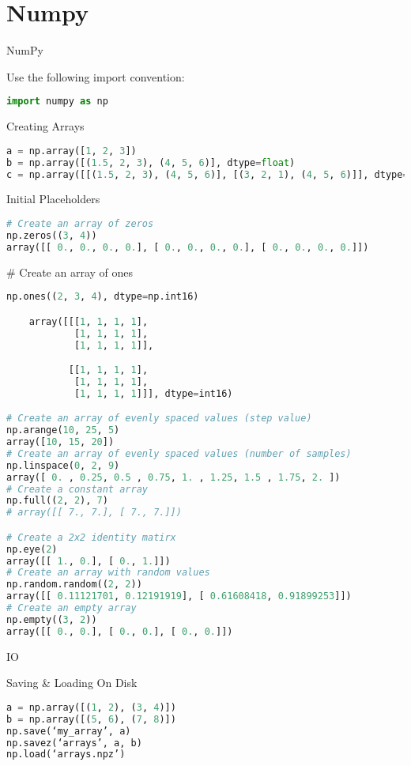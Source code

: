 \section{Numpy}

NumPy

Use the following import convention:

\begin{lstlisting}[language=Python]
import numpy as np
\end{lstlisting}

Creating Arrays

\begin{lstlisting}[language=Python]
a = np.array([1, 2, 3])
b = np.array([(1.5, 2, 3), (4, 5, 6)], dtype=float)
c = np.array([[(1.5, 2, 3), (4, 5, 6)], [(3, 2, 1), (4, 5, 6)]], dtype=float)
\end{lstlisting}

Initial Placeholders

\begin{lstlisting}[language=Python]
# Create an array of zeros
np.zeros((3, 4))
array([[ 0., 0., 0., 0.], [ 0., 0., 0., 0.], [ 0., 0., 0., 0.]])
\end{lstlisting}

# Create an array of ones

\begin{lstlisting}[language=Python]
np.ones((2, 3, 4), dtype=np.int16)

    array([[[1, 1, 1, 1],
            [1, 1, 1, 1],
            [1, 1, 1, 1]],

           [[1, 1, 1, 1],
            [1, 1, 1, 1],
            [1, 1, 1, 1]]], dtype=int16)

# Create an array of evenly spaced values (step value)
np.arange(10, 25, 5)
array([10, 15, 20])
# Create an array of evenly spaced values (number of samples)
np.linspace(0, 2, 9)
array([ 0. , 0.25, 0.5 , 0.75, 1. , 1.25, 1.5 , 1.75, 2. ])
# Create a constant array
np.full((2, 2), 7)
# array([[ 7., 7.], [ 7., 7.]])

# Create a 2x2 identity matirx
np.eye(2)
array([[ 1., 0.], [ 0., 1.]])
# Create an array with random values
np.random.random((2, 2))
array([[ 0.11121701, 0.12191919], [ 0.61608418, 0.91899253]])
# Create an empty array
np.empty((3, 2))
array([[ 0., 0.], [ 0., 0.], [ 0., 0.]])
\end{lstlisting}

IO

Saving & Loading On Disk

\begin{lstlisting}[language=Python]
a = np.array([(1, 2), (3, 4)])
b = np.array([(5, 6), (7, 8)])
np.save(‘my_array’, a)
np.savez(‘arrays’, a, b)
np.load(‘arrays.npz’)
\end{lstlisting}

